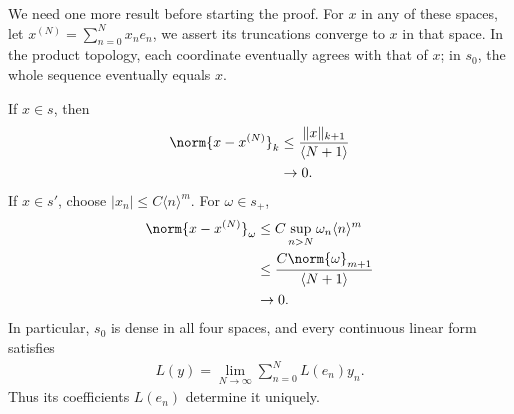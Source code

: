 \documentclass[10pt]{mypackage}
\begin{document}
We need one more result before starting the proof. For \(x\) in any of these spaces, let \(x^{(N)}=\sum_{n=0}^N x_ne_n\), we assert its truncations converge to \(x\) in that space. In the product topology, each coordinate eventually agrees with that of \(x\); in \(s_0\), the whole sequence eventually equals \(x\).

If \(x\in s\), then
\begin{align*}
  \norm{x-x^{(N)}}_{k} &\le\frac{\|x\|_{k+1}}{\langle N+1\rangle}\\
                       &\to 0.
\end{align*}
If \(x\in s'\), choose \(\left\vert x_n \right\vert\le C\langle n\rangle^m\). For \(\omega\in s_+\),
\begin{align*}
  \norm{x-x^{(N)}}_{\omega} &\le C\sup_{n>N}\omega_n\langle n\rangle^m\\
                            &\leq \frac{C\norm{\omega}_{m+1}}{\langle N+1\rangle}\\
                            &\to 0.
\end{align*}
In particular, \(s_0\) is dense in all four spaces, and every continuous linear form satisfies
\begin{align*}
  L(y)=\lim_{N\to\infty}\sum_{n=0}^N L(e_n)y_n.\label{eq:truncation}\tag{3}
\end{align*}
Thus its coefficients \(L(e_n)\) determine it uniquely.
\end{document}
